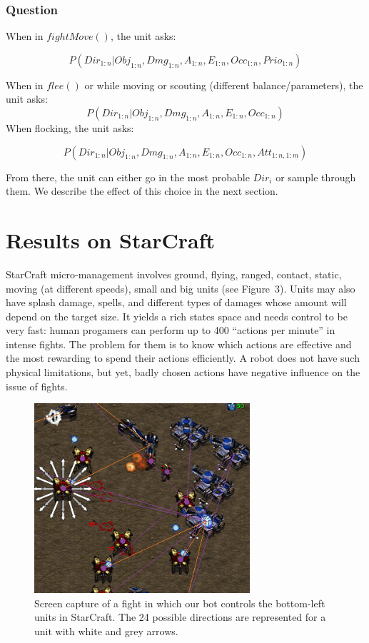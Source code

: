 \subsubsection{Question}

When in $fightMove()$, the unit asks:
\begin{small}
$$P(Dir_{1:n} \mathbf{|} Obj_{1:n}, Dmg_{1:n}, A_{1:n}, E_{1:n}, Occ_{1:n}, Prio_{1:n})$$
\end{small}
When in $flee()$ or while moving or scouting (different balance/parameters), the unit asks:
$$P(Dir_{1:n} \mathbf{|} Obj_{1:n}, Dmg_{1:n}, A_{1:n}, E_{1:n}, Occ_{1:n})$$
When flocking, the unit asks:
\begin{small}
$$P(Dir_{1:n} \mathbf{|} Obj_{1:n}, Dmg_{1:n}, A_{1:n}, E_{1:n}, Occ_{1:n}, Att_{1:n,1:m}) $$
\end{small}
From there, the unit can either go in the most probable $Dir_i$ or sample through them. We describe the effect of this choice in the next section.

\section{Results on StarCraft}
StarCraft micro-management involves ground, flying, ranged, contact, static, moving (at different speeds), small and big units (see Figure~3). Units may also have splash damage, spells, and different types of damages whose amount will depend on the target size. It yields a rich states space and needs control to be very fast: human progamers can perform up to 400 ``actions per minute'' in intense fights. The problem for them is to know which actions are effective and the most rewarding to spend their actions efficiently. A robot does not have such physical limitations, but yet, badly chosen actions have negative influence on the issue of fights. %
\begin{figure}
\begin{center}
\includegraphics[width=8cm]{images/SC_fight_3b.png}
\end{center}
\label{fig:sc_fight}
\caption{Screen capture of a fight in which our bot controls the bottom-left units in StarCraft. The 24 possible directions are represented for a unit with white and grey arrows.}
\end{figure}

